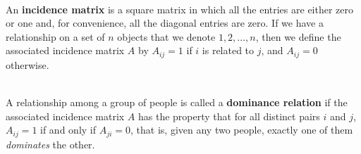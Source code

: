 \begin{definition}
	\hfill\\
	An \textbf{incidence matrix} is a square matrix in which all the entries are either zero or one and, for convenience, all the diagonal entries are zero. If we have a relationship on a set of $n$ objects that we denote $1, 2, \dots, n$, then we define the associated incidence matrix $A$ by $A_{ij} = 1$ if $i$ is related to $j$, and $A_{ij} = 0$ otherwise.
\end{definition}

\begin{definition}
	\hfill\\
	A relationship among a group of people is called a \textbf{dominance relation} if the associated incidence matrix $A$ has the property that for all distinct pairs $i$ and $j$, $A_{ij} = 1$ if and only if $A_{ji} = 0$, that is, given any two people, exactly one of them \textit{dominates} the other.
\end{definition}